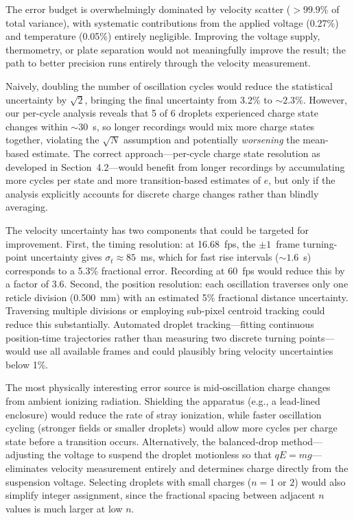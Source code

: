\documentclass[11pt]{article}
\begin{document}
The error budget is overwhelmingly dominated by velocity scatter ($> 99.9\%$ of total variance), with systematic contributions from the applied voltage (0.27\%) and temperature (0.05\%) entirely negligible. Improving the voltage supply, thermometry, or plate separation would not meaningfully improve the result; the path to better precision runs entirely through the velocity measurement.

Naively, doubling the number of oscillation cycles would reduce the statistical uncertainty by $\sqrt{2}$, bringing the final uncertainty from 3.2\% to $\sim 2.3\%$. However, our per-cycle analysis reveals that 5 of 6 droplets experienced charge state changes within $\sim 30$~s, so longer recordings would mix more charge states together, violating the $\sqrt{N}$ assumption and potentially \emph{worsening} the mean-based estimate. The correct approach---per-cycle charge state resolution as developed in Section~4.2---would benefit from longer recordings by accumulating more cycles per state and more transition-based estimates of $e$, but only if the analysis explicitly accounts for discrete charge changes rather than blindly averaging.

The velocity uncertainty has two components that could be targeted for improvement. First, the timing resolution: at 16.68~fps, the $\pm 1$~frame turning-point uncertainty gives $\sigma_t \approx 85$~ms, which for fast rise intervals ($\sim 1.6$~s) corresponds to a 5.3\% fractional error. Recording at 60~fps would reduce this by a factor of 3.6. Second, the position resolution: each oscillation traverses only one reticle division (0.500~mm) with an estimated 5\% fractional distance uncertainty. Traversing multiple divisions or employing sub-pixel centroid tracking could reduce this substantially. Automated droplet tracking---fitting continuous position-time trajectories rather than measuring two discrete turning points---would use all available frames and could plausibly bring velocity uncertainties below 1\%.

The most physically interesting error source is mid-oscillation charge changes from ambient ionizing radiation. Shielding the apparatus (e.g., a lead-lined enclosure) would reduce the rate of stray ionization, while faster oscillation cycling (stronger fields or smaller droplets) would allow more cycles per charge state before a transition occurs. Alternatively, the balanced-drop method---adjusting the voltage to suspend the droplet motionless so that $qE = mg$---eliminates velocity measurement entirely and determines charge directly from the suspension voltage. Selecting droplets with small charges ($n = 1$ or $2$) would also simplify integer assignment, since the fractional spacing between adjacent $n$ values is much larger at low $n$.
\end{document}
